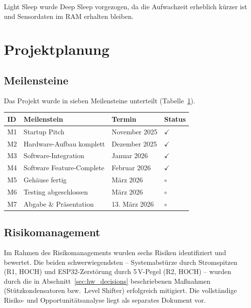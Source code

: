 Light Sleep wurde Deep Sleep vorgezogen, da die Aufwachzeit erheblich kürzer ist und Sensordaten im RAM erhalten bleiben.

\section{Projektplanung}
\label{sec:schedule}

\subsection{Meilensteine}

Das Projekt wurde in sieben Meilensteine unterteilt (Tabelle~\ref{tab:milestones}).

\begin{table}[htb]
\centering
\renewcommand{\arraystretch}{1.3}
\label{tab:milestones}
\begin{tabular}{l l l l}
\toprule
\rowcolor{tableheader}
\textbf{ID} & \textbf{Meilenstein} & \textbf{Termin} & \textbf{Status} \\
\midrule
M1 & Startup Pitch & November 2025 & $\checkmark$ \\
M2 & Hardware-Aufbau komplett & Dezember 2025 & $\checkmark$ \\
M3 & Software-Integration & Januar 2026 & $\checkmark$ \\
M4 & Software Feature-Complete & Februar 2026 & $\checkmark$ \\
M5 & Gehäuse fertig & März 2026 & $\circ$ \\
M6 & Testing abgeschlossen & März 2026 & $\circ$ \\
M7 & Abgabe \& Präsentation & 13. März 2026 & $\circ$ \\
\bottomrule
\end{tabular}
\end{table}

\subsection{Risikomanagement}

Im Rahmen des Risikomanagements wurden sechs Risiken identifiziert und bewertet. Die beiden schwerwiegendsten -- Systemabstürze durch Stromspitzen (R1, HOCH) und ESP32-Zerstörung durch 5\,V-Pegel (R2, HOCH) -- wurden durch die in Abschnitt~\ref{sec:hw_decisions} beschriebenen Maßnahmen (Stützkondensatoren bzw.\ Level Shifter) erfolgreich mitigiert. Die vollständige Risiko- und Opportunitätsanalyse liegt als separates Dokument vor.

